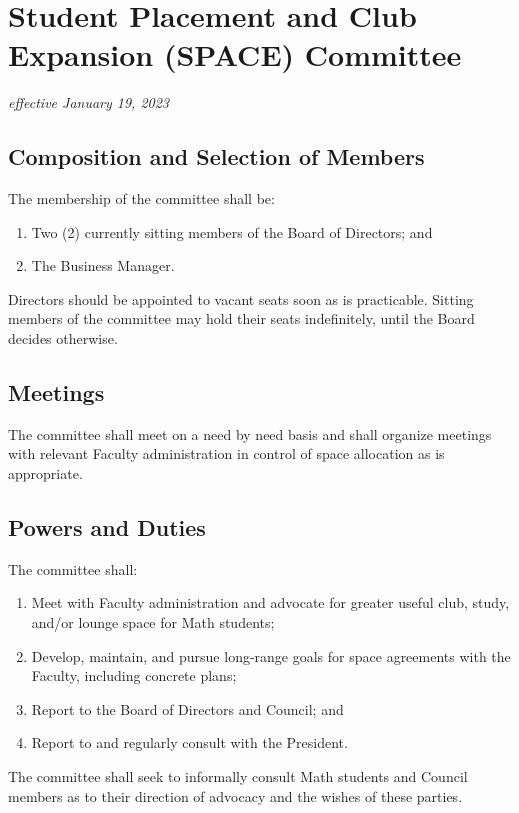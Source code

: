 \section{Student Placement and Club Expansion (SPACE) Committee}
\emph{effective January 19, 2023}\\

\subsection{Composition and Selection of Members}
The membership of the committee shall be:
\begin{enumerate}
    \item Two (2) currently sitting members of the Board of Directors; and
    \item The Business Manager.
\end{enumerate}

Directors should be appointed to vacant seats soon as is practicable. Sitting members of the committee may hold their seats indefinitely, until the Board decides otherwise.

\subsection{Meetings}
The committee shall meet on a need by need basis and shall organize meetings with relevant Faculty administration in control of space allocation as is appropriate.

\subsection{Powers and Duties}
The committee shall: 
\begin{enumerate}
    \item Meet with Faculty administration and advocate for greater useful club, study, and/or lounge space for Math students;
    \item Develop, maintain, and pursue long-range goals for space agreements with the Faculty, including concrete plans;
    \item Report to the Board of Directors and Council; and
    \item Report to and regularly consult with the President.
\end{enumerate}
The committee shall seek to informally consult Math students and Council members as to their direction of advocacy and the wishes of these parties.
